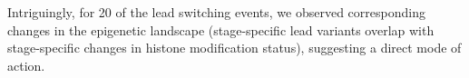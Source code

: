 Intriguingly, for 20 of the lead switching events, we observed corresponding changes in the epigenetic landscape (stage-specific lead variants overlap with stage-specific changes in histone modification status), suggesting a direct mode of action.

